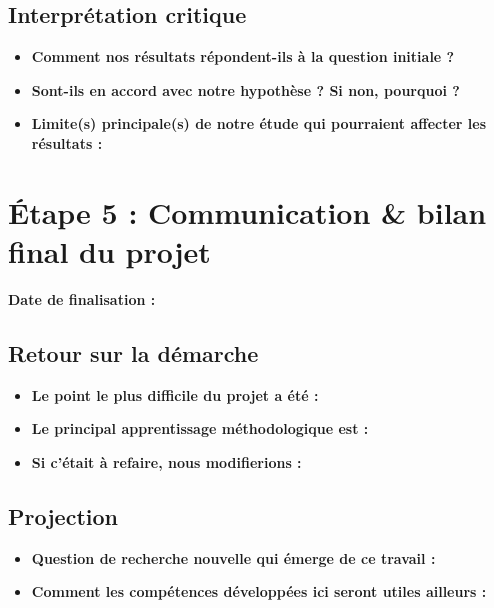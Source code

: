 \documentclass[11pt, a4paper]{article}
\begin{document}
\subsection{Interprétation critique}
\begin{itemize}
    \item[$\bullet$] \textbf{Comment nos résultats répondent-ils à la question initiale ?}
    \item[$\bullet$] \textbf{Sont-ils en accord avec notre hypothèse ? Si non, pourquoi ?}
    \item[$\bullet$] \textbf{Limite(s) principale(s) de notre étude qui pourraient affecter les résultats :}
\end{itemize}

\newpage
\section{Étape 5 : Communication \& bilan final du projet}

\medskip

\textbf{Date de finalisation :} \hrulefill

\medskip

\subsection{Retour sur la démarche}
\begin{itemize}
    \item[$\bullet$] \textbf{Le point le plus difficile du projet a été :}
    \item[$\bullet$] \textbf{Le principal apprentissage méthodologique est :}
    \item[$\bullet$] \textbf{Si c'était à refaire, nous modifierions :}
\end{itemize}

\subsection{Projection}
\begin{itemize}
    \item[$\bullet$] \textbf{Question de recherche nouvelle qui émerge de ce travail :}
    \item[$\bullet$] \textbf{Comment les compétences développées ici seront utiles ailleurs :}
\end{itemize}
\end{document}
